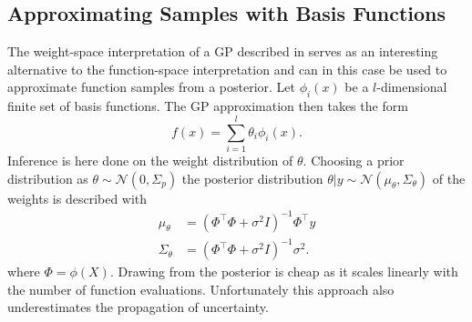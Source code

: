  \subsection{Approximating Samples with Basis Functions}
    The weight-space interpretation of a GP described in \cite{Paper5:PriorPosteriorSplit} serves as an interesting alternative to the function-space interpretation and can in this case be used to approximate function samples from a posterior. Let $\phi_i(x)$ be a $l$-dimensional finite set of basis functions. The GP approximation then takes the form
    \begin{equation}
        f\left({x}\right)=\sum_{i=1}^{l} \theta_i \phi_i(x).
    \end{equation}
    Inference is here done on the weight distribution of $\theta$. Choosing a prior distribution as $\theta \sim \mathcal N (0,\Sigma_p)$ the posterior distribution $\theta|y\sim \mathcal N (\mu_\theta,\Sigma_\theta)$ of the weights is described with
    \begin{equation}
        \begin{aligned}
            {\mu_\theta}&=\left({\Phi}^{\top} {\Phi}+\sigma^{2} {I}\right)^{-1} {\Phi}^{\top} {y} \\
            {\Sigma_\theta}  &=\left({\Phi}^{\top} {\Phi}+\sigma^{2} {I}\right)^{-1} \sigma^{2}.
        \end{aligned}    
    \end{equation}
    where $\Phi = \phi(X)$. Drawing from the posterior is cheap as it scales linearly with the number of function evaluations. Unfortunately this approach also underestimates the propagation of uncertainty.
